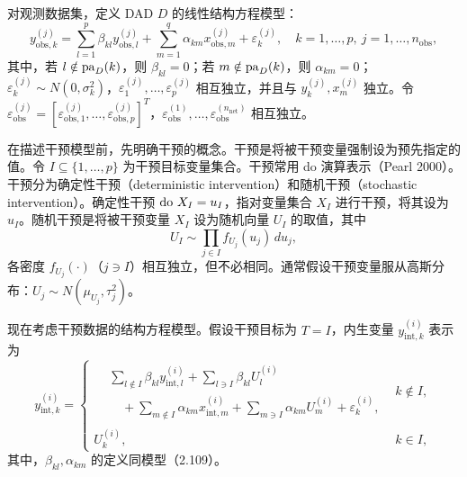 对观测数据集，定义 DAD $D$ 的线性结构方程模型：
\begin{equation}
y_{\mathrm{obs},k}^{(j)}
=\sum_{l=1}^{p}\beta_{kl}y_{\mathrm{obs},l}^{(j)}
+\sum_{m=1}^{q}\alpha_{km}x_{\mathrm{obs},m}^{(j)}
+\varepsilon_k^{(j)},
\quad k=1,\ldots,p,\ j=1,\ldots,n_{\mathrm{obs}},
\tag{2.109}
\end{equation}
其中，若 $l\notin\mathrm{pa}_D(k)$，则 $\beta_{kl}=0$；若 $m\notin\mathrm{pa}_D(k)$，则 $\alpha_{km}=0$；$\varepsilon_k^{(j)}\sim N(0,\sigma_k^2)$，$\varepsilon_1^{(j)},\ldots,\varepsilon_p^{(j)}$ 相互独立，并且与 $y_k^{(j)},x_m^{(j)}$ 独立。令 $\varepsilon_{\mathrm{obs}}^{(j)}=[\varepsilon_{\mathrm{obs},1}^{(j)},\ldots,\varepsilon_{\mathrm{obs},p}^{(j)}]^T$，$\varepsilon_{\mathrm{obs}}^{(1)},\ldots,\varepsilon_{\mathrm{obs}}^{(n_{\mathrm{net}})}$ 相互独立。

在描述干预模型前，先明确干预的概念。干预是将被干预变量强制设为预先指定的值。令 $I\subseteq\{1,\ldots,p\}$ 为干预目标变量集合。干预常用 do 演算表示（Pearl 2000）。干预分为确定性干预（deterministic intervention）和随机干预（stochastic intervention）。确定性干预 $\operatorname{do}\,X_I=u_I$，指对变量集合 $X_I$ 进行干预，将其设为 $u_I$。随机干预是将被干预变量 $X_I$ 设为随机向量 $U_I$ 的取值，其中
\[
U_I\sim\prod_{j\in I}f_{U_j}(u_j)\,du_j,
\]
各密度 $f_{U_j}(\cdot)$（$j\ni I$）相互独立，但不必相同。通常假设干预变量服从高斯分布：$U_j\sim N(\mu_{U_j},\tau_j^2)$。

现在考虑干预数据的结构方程模型。假设干预目标为 $T=I$，内生变量 $y_{\mathrm{int},k}^{(i)}$ 表示为
\begin{equation}
y_{\mathrm{int},k}^{(i)}=
\begin{cases}
\begin{aligned}
&\displaystyle\sum_{l\notin I}\beta_{kl}y_{\mathrm{int},l}^{(i)}
+\sum_{l\ni I}\beta_{kl}U_l^{(i)}\\
&\displaystyle\quad+\sum_{m\notin I}\alpha_{km}x_{\mathrm{int},m}^{(i)}
+\sum_{m\ni I}\alpha_{km}U_m^{(i)}+\varepsilon_k^{(i)},
\end{aligned}
&k\notin I,\\
U_k^{(i)},&k\in I,
\end{cases}
\tag{2.110}
\end{equation}
其中，$\beta_{kl},\alpha_{km}$ 的定义同模型（2.109）。

